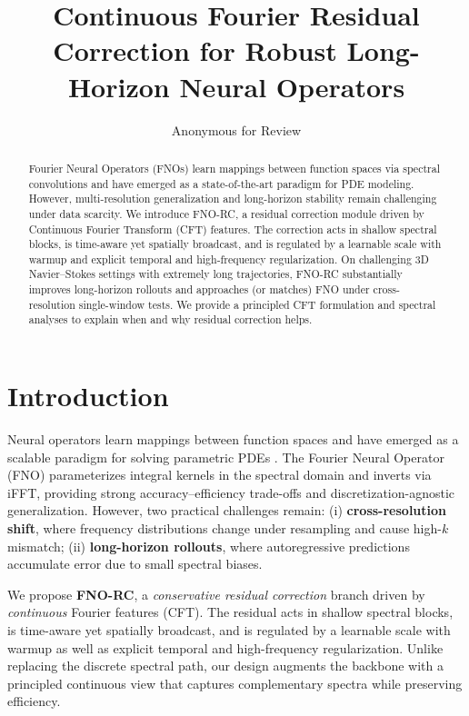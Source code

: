 \documentclass[11pt]{article}
\title{Continuous Fourier Residual Correction for Robust Long-Horizon Neural Operators}
\author{Anonymous for Review}
\date{\vspace{-1em}}
\begin{document}
\maketitle

\begin{abstract}
Fourier Neural Operators (FNOs) learn mappings between function spaces via spectral convolutions and have emerged as a state-of-the-art paradigm for PDE modeling. However, multi-resolution generalization and long-horizon stability remain challenging under data scarcity. We introduce FNO-RC, a residual correction module driven by Continuous Fourier Transform (CFT) features. The correction acts in shallow spectral blocks, is time-aware yet spatially broadcast, and is regulated by a learnable scale with warmup and explicit temporal and high-frequency regularization. On challenging 3D Navier--Stokes settings with extremely long trajectories, FNO-RC substantially improves long-horizon rollouts and approaches (or matches) FNO under cross-resolution single-window tests. We provide a principled CFT formulation and spectral analyses to explain when and why residual correction helps.
\end{abstract}

\section{Introduction}
Neural operators learn mappings between function spaces and have emerged as a scalable paradigm for solving parametric PDEs \citep{kovachki2021neural, lu2021learning}. The Fourier Neural Operator (FNO) \citep{Li2020FNO} parameterizes integral kernels in the spectral domain and inverts via iFFT, providing strong accuracy--efficiency trade-offs and discretization-agnostic generalization. However, two practical challenges remain: (i) \textbf{cross-resolution shift}, where frequency distributions change under resampling and cause high-$k$ mismatch; (ii) \textbf{long-horizon rollouts}, where autoregressive predictions accumulate error due to small spectral biases.

We propose \textbf{FNO-RC}, a \emph{conservative residual correction} branch driven by \emph{continuous} Fourier features (CFT). The residual acts in shallow spectral blocks, is time-aware yet spatially broadcast, and is regulated by a learnable scale with warmup as well as explicit temporal and high-frequency regularization. Unlike replacing the discrete spectral path, our design augments the backbone with a principled continuous view that captures complementary spectra while preserving efficiency.
\end{document}
